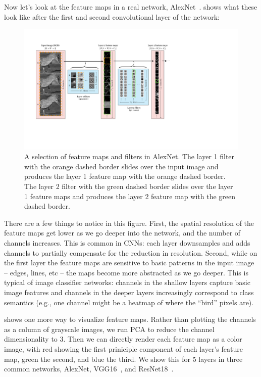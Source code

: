 Now let's look at the feature maps in a real network, AlexNet~\cite{krizhevsky2012imagenet}. \Fig{\ref{fig:convolutional_neural_nets:alexnet_feature_maps}} shows what these look like after the first and second convolutional layer of the network:
\begin{figure}[h!]
\centerline{
\includegraphics[width=1.0\linewidth]{./figures/convolutional_neural_nets/alexnet_feature_maps.pdf}}
\caption{A selection of feature maps and filters in AlexNet. The layer 1 filter with the orange dashed border slides over the input image and produces the layer 1 feature map with the orange dashed border. The layer 2 filter with the green dashed border slides over the layer 1 feature maps and produces the layer 2 feature map with the green dashed border.}
\label{fig:convolutional_neural_nets:alexnet_feature_maps}
\end{figure}

There are a few things to notice in this figure. First, the spatial resolution of the feature maps get lower as we go deeper into the network, and the number of channels increases. This is common in CNNs: each layer downsamples and adds channels to partially compensate for the reduction in resolution. Second, while on the first layer the feature maps are sensitive to basic patterns in the input image -- edges, lines, etc -- the maps become more abstracted as we go deeper. This is typical of image classifier networks: channels in the shallow layers capture basic image features and channels in the deeper layers increasingly correspond to class semantics (e.g., one channel might be a heatmap of where the ``bird'' pixels are).

\Fig{\ref{fig:convolutional_neural_nets:feature_maps_pca_viz}} shows one more way to visualize feature maps. Rather than plotting the channels as a column of grayscale images, we run PCA to reduce the channel dimensionality to 3. Then we can directly render each feature map as a color image, with red showing the first priniciple component of each layer's feature map, green the second, and blue the third. We show this for 5 layers in three common networks, AlexNet, VGG16~\cite{vgg16}, and ResNet18~\cite{he2016deep}.

